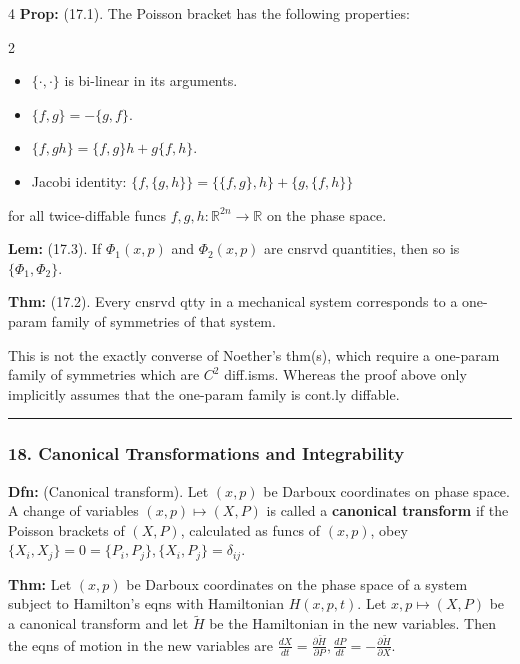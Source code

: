 \documentclass[landscape, 8pt]{extarticle}
\begin{document}
\begin{multicols*}{4}
		\textbf{Prop:} (17.1). The Poisson bracket has the following properties:
		\vspace*{-10pt}
		\begin{multicols*}{2}
		\begin{itemize}[leftmargin=*,topsep=0pt,itemsep=0pt]
			\item $\{\cdot,\cdot\}$ is bi-linear in its arguments.
			\item $\{f,g\}=-\{g,f\}$.
			\item $\{f,gh\}=\{f,g\}h+g\{f,h\}$.
		\end{itemize}
	\end{multicols*}
	\vspace*{-10pt}
	\begin{itemize}
		\item Jacobi identity: $\{f,\{g,h\}\}=\{\{f,g\},h\}+\{g,\{f,h\}\}$
	\end{itemize}
		for all twice-diffable funcs $f,g,h:\mathbb{R}^{2n}\to\mathbb{R}$ on the phase space.
		
		\textbf{Lem:} (17.3). If $\Phi_1(x,p)$ and $\Phi_2(x,p)$ are cnsrvd quantities, then so is $\{\Phi_1,\Phi_2\}$.
		
		\textbf{Thm:} (17.2). Every cnsrvd qtty in a mechanical system corresponds to a one-param family of symmetries of that system.
		
		This is not the exactly converse of Noether's thm(s), which require a one-param family of symmetries which are $C^2$ diff.isms. Whereas the proof above only implicitly assumes that the one-param family is cont.ly diffable.
		
		\hrule
		\vspace*{-3pt}
		\subsubsection*{\tiny{18. Canonical Transformations and Integrability}}
		\vspace*{-5pt}
		
		\textbf{Dfn:} (Canonical transform). Let $(x,p)$ be Darboux coordinates on phase space. A change of variables $(x,p)\mapsto(X,P)$ is called a \textbf{canonical transform} if the Poisson brackets of $(X,P)$, calculated as funcs of $(x,p)$, obey
		$
		\{X_i,X_j\}=0=\{P_i,P_j\},\{X_i,P_j\}=\delta_{ij}.
		$
		
		\textbf{Thm:} Let $(x,p)$ be Darboux coordinates on the phase space of a system subject to Hamilton's eqns with Hamiltonian $H(x,p,t)$. Let $x,p\mapsto(X,P)$ be a canonical transform and let $\tilde{H}$ be the Hamiltonian in the new variables. Then the eqns of motion in the new variables are
		$
		\frac{dX}{dt}=\frac{\partial\tilde{H}}{\partial P},\frac{dP}{dt}=-\frac{\partial\tilde{H}}{\partial X}.
		$
		

\end{multicols*}
\end{document}
